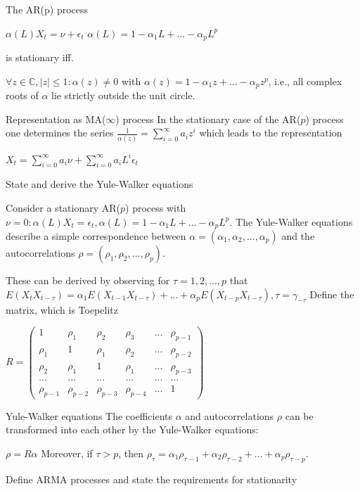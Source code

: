 The AR(p) process

\(\alpha(L)X_t = \nu + \epsilon_t\)
\(\alpha(L) = 1 - \alpha_1 L + ... - \alpha_p L^p\)

is stationary iff.

\(\forall z \in \mathbb{C}, |z| \le 1: \alpha(z) \ne 0\) with \(\alpha(z) = 1 - \alpha_1 z + ... - \alpha_p z^p\),
i.e., all complex roots of \(\alpha\) lie strictly outside the unit circle.

Representation as MA(\(\infty\)) process
In the stationary case of the AR(\(p\)) process one determines the series \(\frac{1}{\alpha(z)} = \sum_{i = 0}^\infty a_i z^i\) which leads to the representation

\(X_t = \sum_{i = 0}^\infty a_i \nu + \sum_{i = 0}^\infty a_i L^i \epsilon_t\)


State and derive the Yule-Walker equations

Consider a stationary AR(\(p\)) process with \(\nu = 0: \alpha(L)X_t = \epsilon_t, \alpha(L) = 1 - \alpha_1 L + ... - \alpha_p L^p\). 
The Yule-Walker equations describe a simple correspondence between \(\alpha = (\alpha_1, \alpha_2, ..., \alpha_p)\) 
and the autocorrelations \(\rho = (\rho_1, \rho_2, ..., \rho_p)\).

These can be derived by observing for \(\tau = 1, 2, ..., p\) 
that \(E(X_t X_{t - \tau}) = \alpha_1 E(X_{t - 1} X_{t - \tau}) + \dots + \alpha_p E(X_{t - p} X_{t - \tau}), \tau = \gamma_{-\tau}\)
Define the matrix, which is Toepelitz

\(R = \begin{pmatrix} 1 & \rho_1 & \rho_2 & \rho_3 & ... & \rho_{p - 1} \\ \rho_1 & 1 & \rho_1 & \rho_2 & ... & \rho_{p - 2} \\ \rho_2 & \rho_1 & 1 & \rho_1 & ... & \rho_{p - 3} \\ ... & ... & ... & ... & ... & ... \\ \rho_{p - 1} & \rho_{p - 2} & \rho_{p - 3} & \rho_{p - 4} & ... & 1 \end{pmatrix}\)

Yule-Walker equations
The coefficients \(\alpha\) and autocorrelations \(\rho\) can be transformed into each other by the Yule-Walker equations:

\(\rho = R \alpha\)
Moreover, if \(\tau > p\), then \(\rho_\tau = \alpha_1 \rho_{\tau - 1} + \alpha_2 \rho_{\tau - 2} + ... + \alpha_p \rho_{\tau - p}\).


Define ARMA processes and state the requirements for stationarity


